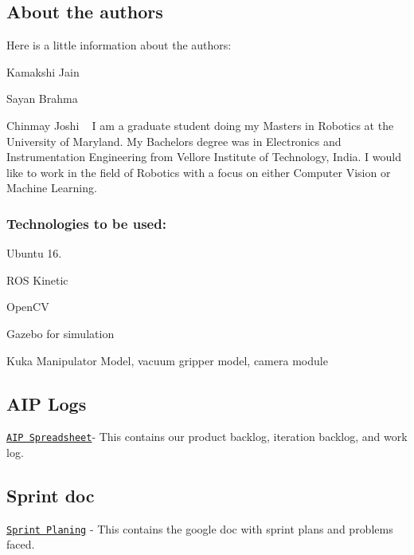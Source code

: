 \subsection*{About the authors}

Here is a little information about the authors\+:


\begin{DoxyItemize}
\item Kamakshi Jain
\item Sayan Brahma
\item Chinmay Joshi ~\newline
 I am a graduate student doing my Master\textquotesingle{}s in Robotics at the University of Maryland. My Bachelor\textquotesingle{}s degree was in Electronics and Instrumentation Engineering from Vellore Institute of Technology, India. I would like to work in the field of Robotics with a focus on either Computer Vision or Machine Learning.
\end{DoxyItemize}

\subsubsection*{Technologies to be used\+:}


\begin{DoxyItemize}
\item Ubuntu 16.
\item R\+OS Kinetic
\item Open\+CV
\item Gazebo for simulation
\item Kuka Manipulator Model, vacuum gripper model, camera module
\end{DoxyItemize}

\subsection*{A\+IP Logs}

\href{https://docs.google.com/spreadsheets/d/1l3zZY-S-sCEj8x_SvJREo7-diR4zwI-w_J22i3sZJyI/edit?usp=sharing}{\tt A\+IP Spreadsheet}-\/ This contains our product backlog, iteration backlog, and work log. \subsection*{Sprint doc}

\href{https://docs.google.com/document/d/1x5kZCbR9iNZZeu6fHsHf5Rvu3TCuqFMhLQ0rkCWsUQ4/edit?usp=sharing}{\tt Sprint Planing} -\/ This contains the google doc with sprint plans and problems faced.

